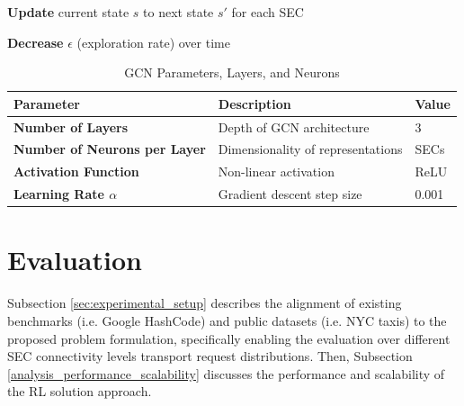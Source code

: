\begin{algorithm}[ht]
{{        
        
        \textbf{Update} current state $s$ to next state $s'$ for each SEC\;
    }
    
    
    \textbf{Decrease} $\epsilon$ (exploration rate) over time\;
}
\end{algorithm} \label{algo:decentralised_vehicle_allocation}

\begin{table}[h]
    \centering
    \caption{GCN Parameters, Layers, and Neurons}
    \begin{tabular}{@{}lll@{}}
    \toprule
    \textbf{Parameter} & \textbf{Description} & \textbf{Value} \\ \midrule
    \textbf{Number of Layers} & Depth of GCN architecture & 3 \\
    \textbf{Number of Neurons per Layer} & Dimensionality of representations & SECs  \\
    \textbf{Activation Function} & Non-linear activation & ReLU \\
    \textbf{Learning Rate \(\alpha\)} & Gradient descent step size & 0.001 \\ \bottomrule
    \end{tabular}
    \label{tab:gcn_table}
\end{table}

\section{Evaluation}
\label{sec:evaluation}

Subsection \ref{sec:experimental_setup} describes the alignment of existing benchmarks (i.e. Google HashCode) and public
datasets (i.e. NYC taxis) to the proposed problem formulation, specifically enabling the evaluation over different
SEC connectivity levels transport request distributions.
Then, Subsection \ref{analysis_performance_scalability} discusses the performance and scalability of the RL
solution approach.

